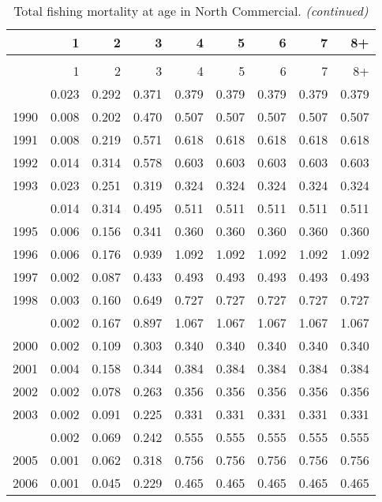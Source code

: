 \documentclass[
]{article}
\begin{document}
\begin{longtable}[t]{lrrrrrrrr}
\caption{\label{tab:North_Commercial-fleet-FAA-table}Total fishing mortality at age in North Commercial.}\\
\toprule
  & 1 & 2 & 3 & 4 & 5 & 6 & 7 & 8+\\
\midrule
\endfirsthead
\caption[]{Total fishing mortality at age in North Commercial. \textit{(continued)}}\\
\toprule
  & 1 & 2 & 3 & 4 & 5 & 6 & 7 & 8+\\
\midrule
\endhead

\endfoot
\bottomrule
\endlastfoot
1989 & 0.023 & 0.292 & 0.371 & 0.379 & 0.379 & 0.379 & 0.379 & 0.379\\
1990 & 0.008 & 0.202 & 0.470 & 0.507 & 0.507 & 0.507 & 0.507 & 0.507\\
1991 & 0.008 & 0.219 & 0.571 & 0.618 & 0.618 & 0.618 & 0.618 & 0.618\\
1992 & 0.014 & 0.314 & 0.578 & 0.603 & 0.603 & 0.603 & 0.603 & 0.603\\
1993 & 0.023 & 0.251 & 0.319 & 0.324 & 0.324 & 0.324 & 0.324 & 0.324\\
\addlinespace
1994 & 0.014 & 0.314 & 0.495 & 0.511 & 0.511 & 0.511 & 0.511 & 0.511\\
1995 & 0.006 & 0.156 & 0.341 & 0.360 & 0.360 & 0.360 & 0.360 & 0.360\\
1996 & 0.006 & 0.176 & 0.939 & 1.092 & 1.092 & 1.092 & 1.092 & 1.092\\
1997 & 0.002 & 0.087 & 0.433 & 0.493 & 0.493 & 0.493 & 0.493 & 0.493\\
1998 & 0.003 & 0.160 & 0.649 & 0.727 & 0.727 & 0.727 & 0.727 & 0.727\\
\addlinespace
1999 & 0.002 & 0.167 & 0.897 & 1.067 & 1.067 & 1.067 & 1.067 & 1.067\\
2000 & 0.002 & 0.109 & 0.303 & 0.340 & 0.340 & 0.340 & 0.340 & 0.340\\
2001 & 0.004 & 0.158 & 0.344 & 0.384 & 0.384 & 0.384 & 0.384 & 0.384\\
2002 & 0.002 & 0.078 & 0.263 & 0.356 & 0.356 & 0.356 & 0.356 & 0.356\\
2003 & 0.002 & 0.091 & 0.225 & 0.331 & 0.331 & 0.331 & 0.331 & 0.331\\
\addlinespace
2004 & 0.002 & 0.069 & 0.242 & 0.555 & 0.555 & 0.555 & 0.555 & 0.555\\
2005 & 0.001 & 0.062 & 0.318 & 0.756 & 0.756 & 0.756 & 0.756 & 0.756\\
2006 & 0.001 & 0.045 & 0.229 & 0.465 & 0.465 & 0.465 & 0.465 & 0.465\\

\end{longtable}
\end{document}
